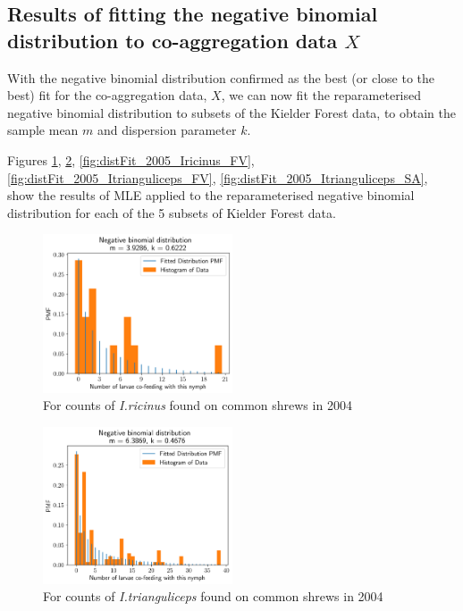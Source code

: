 \documentclass{article}
\begin{document}
\clearpage

\subsection{Results of fitting the negative binomial distribution to co-aggregation data \texorpdfstring{$ X $}{X}}

With the negative binomial distribution confirmed as the best (or close to the best) fit for the co-aggregation data, $ X $, we can now fit the reparameterised negative binomial distribution to subsets of the Kielder Forest data, to obtain the sample mean $ m $ and dispersion parameter $ k $.

Figures \ref{fig:distFit_2004_Iricinus_SA}, \ref{fig:distFit_2004_Itrianguliceps_SA}, \ref{fig:distFit_2005_Iricinus_FV}, \ref{fig:distFit_2005_Itrianguliceps_FV}, \ref{fig:distFit_2005_Itrianguliceps_SA}, show the results of MLE applied to the reparameterised negative binomial distribution for each of the 5 subsets of Kielder Forest data.

\begin{figure}[ht]
	\begin{mdframed}[backgroundcolor=grey250,rightline=false,leftline=false,topline=false]
	\includegraphics[width=0.5\textwidth, center]{coaggregation_dist_2004_I.ricinus_SA.png}
	\caption{For counts of \textit{I.ricinus} found on common shrews in 2004}\label{fig:distFit_2004_Iricinus_SA}
	\end{mdframed}
\end{figure}

\begin{figure}[ht]
	\begin{mdframed}[backgroundcolor=grey250,rightline=false,leftline=false,topline=false]
	\includegraphics[width=0.5\textwidth, center]{coaggregation_dist_2004_I.trianguliceps_SA.png}
	\caption{For counts of \textit{I.trianguliceps} found on common shrews in 2004}\label{fig:distFit_2004_Itrianguliceps_SA}
	\end{mdframed}
\end{figure}
\end{document}
